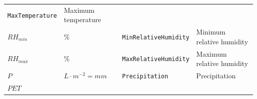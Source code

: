 \documentclass[]{book}
\begin{document}
\begin{longtable}[]{@{}llll@{}}
\begin{minipage}[t]{0.12\columnwidth}
\texttt{MaxTemperature}\strut
\end{minipage} & \begin{minipage}[t]{0.45\columnwidth}\raggedright\strut
Maximum temperature\strut
\end{minipage}\tabularnewline
\begin{minipage}[t]{0.11\columnwidth}\raggedright\strut
\(RH_{min}\)\strut
\end{minipage} & \begin{minipage}[t]{0.10\columnwidth}\raggedright\strut
\%\strut
\end{minipage} & \begin{minipage}[t]{0.12\columnwidth}\raggedright\strut
\texttt{MinRelativeHumidity}\strut
\end{minipage} & \begin{minipage}[t]{0.45\columnwidth}\raggedright\strut
Minimum relative humidity\strut
\end{minipage}\tabularnewline
\begin{minipage}[t]{0.11\columnwidth}\raggedright\strut
\(RH_{max}\)\strut
\end{minipage} & \begin{minipage}[t]{0.10\columnwidth}\raggedright\strut
\%\strut
\end{minipage} & \begin{minipage}[t]{0.12\columnwidth}\raggedright\strut
\texttt{MaxRelativeHumidity}\strut
\end{minipage} & \begin{minipage}[t]{0.45\columnwidth}\raggedright\strut
Maximum relative humidity\strut
\end{minipage}\tabularnewline
\begin{minipage}[t]{0.11\columnwidth}\raggedright\strut
\(P\)\strut
\end{minipage} & \begin{minipage}[t]{0.10\columnwidth}\raggedright\strut
\(L \cdot m^{-2} = mm\)\strut
\end{minipage} & \begin{minipage}[t]{0.12\columnwidth}\raggedright\strut
\texttt{Precipitation}\strut
\end{minipage} & \begin{minipage}[t]{0.45\columnwidth}\raggedright\strut
Precipitation\strut
\end{minipage}\tabularnewline
\begin{minipage}[t]{0.11\columnwidth}\raggedright\strut
\(PET\)\strut
\end{minipage} & \begin{minipage}[t]{0.10\columnwidth}\raggedright\strut

\end{minipage}
\end{longtable}
\end{document}
